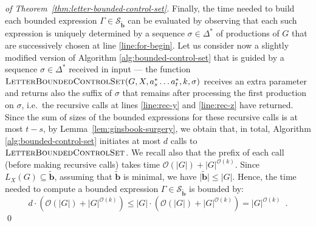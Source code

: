 \documentclass[final]{llncs}
\def\len#1{{\vert{#1}\vert}}
\def\prod{\Delta}
\def\patt{{\widetilde{\mathbf{b}}}}
\begin{document}
\begin{proof}[of Theorem~\ref{thm:letter-bounded-control-set}]
Finally, the time needed to build each bounded
expression \(\Gamma\in\mathcal{S}_\patt\) can be evaluated by
observing that each such expression is uniquely determined by a
sequence \(\sigma\in\prod^*\) of productions of \(G\) that are
successively chosen at line \ref{line:for-begin}. Let us consider now
a slightly modified version of Algorithm \ref{alg:bounded-control-set}
that is guided by a sequence \(\sigma\in\prod^*\) received in input
--- the function \(\Call{LetterBoundedControlSet}{G,X,a_s^* \ldots
a_t^*,k,\sigma}\) receives an extra parameter and returns also the
suffix of \(\sigma\) that remains after processing the first
production on \(\sigma\), i.e.\ the recursive calls at
lines \ref{line:rec-y} and \ref{line:rec-z} have returned.  Since the
sum of sizes of the bounded expressions for these recursive
calls is at most \(t-s\), by Lemma~\ref{lem:ginsbook-surgery}, we
obtain that, in total, Algorithm \ref{alg:bounded-control-set}
initiates at most \(d\) calls to
\(\Call{LetterBoundedControlSet}{}\). We recall also that the
prefix of each call (before making recursive calls) takes
time \(\mathcal{O}(\len{G})
+ \len{G}^{\mathcal{O}(k)}\). Since \(L_X(G) \subseteq \patt\),
assuming that \(\patt\) is minimal, we
have \(\len{\patt} \leq \len{G}\). Hence, the time needed to compute a
bounded expression \(\Gamma\in\mathcal{S}_\patt\) is bounded
by: \[d \cdot (\mathcal{O}(\len{G})
+ \len{G}^{\mathcal{O}(k)}) \leq \len{G}\cdot (\mathcal{O}(\len{G})
+ \len{G}^{\mathcal{O}(k)}) = \len{G}^{\mathcal{O}(k)}\enspace.\]\qed
\end{proof}
\end{document}
